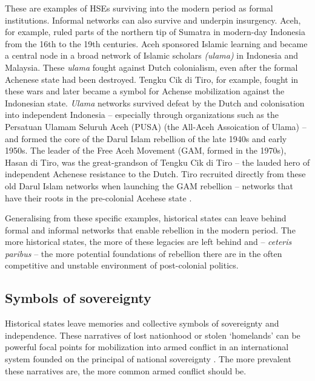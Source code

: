 These are examples of HSEs surviving into the modern period as formal
institutions. Informal networks can also survive and underpin insurgency. Aceh,
for example, ruled parts of the northern tip of Sumatra in modern-day Indonesia
from the 16th to the 19th centuries. Aceh sponsored Islamic learning and became
a central node in a broad network of Islamic scholars \textit{(ulama)} in
Indonesia and Malaysia. These \textit{ulama} fought against Dutch colonialism,
even after the formal Achenese state had been destroyed. Tengku Cik di Tiro, for
example, fought in these wars and later became a symbol for Achense mobilization
against the Indonesian state. \textit{Ulama} networks survived defeat by the
Dutch and colonisation into independent Indonesia -- especially through
organizations such as the Persatuan Ulamam Seluruh Aceh (PUSA) (the All-Aceh
Assoication of Ulama)  \citep[28]{Aspinall2009} -- and formed
the core of the Darul Islam rebellion of the late 1940s and early 1950s.  The
leader of the Free Aceh Movement (GAM, formed in the 1970s), Hasan di Tiro, was the great-grandson of
Tengku Cik di Tiro -- the lauded hero of independent Achenese resistance to the
Dutch. Tiro recruited directly from these old Darul Islam networks when
launching the GAM rebellion -- networks that have their roots in the
pre-colonial Acehese state \citep[61-62]{Aspinall2009}. 


Generalising from these specific examples, historical states can leave behind
formal and informal networks that enable rebellion in the modern period. The
more historical states, the more of these legacies are left behind and --
\textit{ceteris paribus} -- the more potential foundations of rebellion there
are in the often competitive and unstable environment of post-colonial politics. 

 
\subsection{Symbols of sovereignty}

Historical states leave memories and collective symbols of sovereignty and
independence. These narratives of lost nationhood or stolen `homelands' can be
powerful focal points for mobilization into armed conflict in an international
system founded on the principal of national sovereignty \citep{Ahram2019,
Shelef2016}. The more prevalent these narratives are, the more common armed
conflict should be.  

